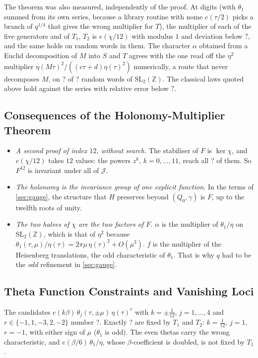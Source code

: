 \documentclass[11pt,a4paper]{article}
\newcommand{\SSThAlphaAgree}{?}\newcommand{\SSThAlphaOf}{?}\newcommand{\SSThCandidates}{?}
\newcommand{\SSThSurvivors}{?}\newcommand{\SSThClassicalErr}{?}\newcommand{\SSThMaxDev}{?}
\newcommand{\SSThCosets}{?}
\newcommand{\ZZ}{\mathbb{Z}}
\newcommand{\SL}{\mathrm{SL}}
\theoremstyle{plain}
\theoremstyle{definition}
\begin{document}
The theorem was also measured, independently of the proof. At \SSThDigits{} digits (with $\theta_1$ summed from its own series, because a library routine
with nome $e(\tau/2)$ picks a branch of $q^{1/4}$ that gives the wrong multiplier for $T$), the multiplier of each of the five generators
and of $T_1$, $T_2$ is $e(\chi/12)$ with modulus $1$ and deviation below $\SSThMaxDev$, and the same holds on \SSThWords{} random words in
them. The character $\alpha$ obtained from a Euclid decomposition of $M$ into $S$ and $T$ agrees with the one read off the $\eta^2$ multiplier
$\eta(M\tau)^2/((c\tau+d)\eta(\tau)^2)$ numerically, a route that never decomposes $M$, on \SSThAlphaAgree{} of \SSThAlphaOf{} random words of $\SL_2(\ZZ)$. The
classical laws quoted above hold against the series with relative error below $\SSThClassicalErr$.

\subsection{Consequences of the Holonomy-Multiplier Theorem}

\begin{itemize}[leftmargin=*]
\item \emph{A second proof of index $12$, without search.} The stabiliser of $F$ is $\ker\chi$, and $e(\chi/12)$ takes $12$ values:
the powers $z^k$, $k=0,\dots,11$, reach all \SSThCosets{} of them. So $F^{12}$ is invariant under all of $\mathcal J$.
\item \emph{The holonomy is the invariance group of one explicit function.} In the terms of \cref{sec:gauge}, the structure that $H$ preserves beyond $(Q_0,\gamma)$
is $F$, up to the twelfth roots of unity.
\item \emph{The two halves of $\chi$ are the two factors of $F$.} $\alpha$ is the multiplier of $\theta_1/\eta$ on $\SL_2(\ZZ)$, which is that of $\eta^2$
because $\theta_1(\tau,\mu)/\eta(\tau)=2\pi\mu\,\eta(\tau)^2+O(\mu^3)$. $f$ is the multiplier of the Heisenberg translations,
the odd characteristic of $\theta_1$. That is why $q$ had to be the \emph{odd} refinement in \cref{sec:gauge}.
\end{itemize}

\subsection{Theta Function Constraints and Vanishing Loci}

The candidates $e(k\beta)\,\theta_j(\tau,\pm\mu)\,\eta(\tau)^r$ with $k=\pm\tfrac1{12}$, $j=1,\dots,4$ and $r\in\{-1,1,-3,2,-2\}$ number
\SSThCandidates. Exactly \SSThSurvivors{} are fixed by $T_1$ and $T_2$: $k=\tfrac1{12}$, $j=1$, $r=-1$, with either sign of $\mu$ ($\theta_1$ is odd). The even thetas carry the wrong
characteristic, and $e(\beta/6)\,\theta_1/\eta$, whose $\beta$-coefficient is doubled, is not fixed by $T_1$.
\end{document}
